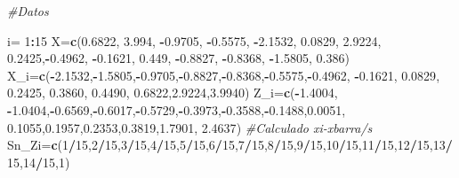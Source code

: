 \documentclass[a4paper,oneside,openany]{book}
\newenvironment{Shaded}{\begin{snugshade}}{\end{snugshade}}
\newcommand{\KeywordTok}[1]{\textcolor[rgb]{0.13,0.29,0.53}{\textbf{#1}}}
\newcommand{\DecValTok}[1]{\textcolor[rgb]{0.00,0.00,0.81}{#1}}
\newcommand{\FloatTok}[1]{\textcolor[rgb]{0.00,0.00,0.81}{#1}}
\newcommand{\StringTok}[1]{\textcolor[rgb]{0.31,0.60,0.02}{#1}}
\newcommand{\CommentTok}[1]{\textcolor[rgb]{0.56,0.35,0.01}{\textit{#1}}}
\newcommand{\OperatorTok}[1]{\textcolor[rgb]{0.81,0.36,0.00}{\textbf{#1}}}
\newcommand{\NormalTok}[1]{#1}
\begin{document}
\begin{Shaded}
\begin{Highlighting}[]
\CommentTok{#Datos}

\NormalTok{i=}\StringTok{ }\DecValTok{1}\OperatorTok{:}\DecValTok{15}
\NormalTok{X=}\KeywordTok{c}\NormalTok{(}\FloatTok{0.6822}\NormalTok{, }\FloatTok{3.994}\NormalTok{, }\OperatorTok{-}\FloatTok{0.9705}\NormalTok{, }\OperatorTok{-}\FloatTok{0.5575}\NormalTok{, }\OperatorTok{-}\FloatTok{2.1532}\NormalTok{, }\FloatTok{0.0829}\NormalTok{, }\FloatTok{2.9224}\NormalTok{,}
    \FloatTok{0.2425}\NormalTok{,}\OperatorTok{-}\FloatTok{0.4962}\NormalTok{, }\OperatorTok{-}\FloatTok{0.1621}\NormalTok{, }\FloatTok{0.449}\NormalTok{, }\OperatorTok{-}\FloatTok{0.8827}\NormalTok{, }\OperatorTok{-}\FloatTok{0.8368}\NormalTok{, }\OperatorTok{-}\FloatTok{1.5805}\NormalTok{, }\FloatTok{0.386}\NormalTok{)}
\NormalTok{X_i=}\KeywordTok{c}\NormalTok{(}\OperatorTok{-}\FloatTok{2.1532}\NormalTok{,}\OperatorTok{-}\FloatTok{1.5805}\NormalTok{,}\OperatorTok{-}\FloatTok{0.9705}\NormalTok{,}\OperatorTok{-}\FloatTok{0.8827}\NormalTok{,}\OperatorTok{-}\FloatTok{0.8368}\NormalTok{,}\OperatorTok{-}\FloatTok{0.5575}\NormalTok{,}\OperatorTok{-}\FloatTok{0.4962}\NormalTok{, }\OperatorTok{-}\FloatTok{0.1621}\NormalTok{,  }\FloatTok{0.0829}\NormalTok{,  }\FloatTok{0.2425}\NormalTok{,}
      \FloatTok{0.3860}\NormalTok{, }\FloatTok{0.4490}\NormalTok{,  }\FloatTok{0.6822}\NormalTok{,}\FloatTok{2.9224}\NormalTok{,}\FloatTok{3.9940}\NormalTok{)}
\NormalTok{Z_i=}\KeywordTok{c}\NormalTok{(}\OperatorTok{-}\FloatTok{1.4004}\NormalTok{, }\OperatorTok{-}\FloatTok{1.0404}\NormalTok{,}\OperatorTok{-}\FloatTok{0.6569}\NormalTok{,}\OperatorTok{-}\FloatTok{0.6017}\NormalTok{,}\OperatorTok{-}\FloatTok{0.5729}\NormalTok{,}\OperatorTok{-}\FloatTok{0.3973}\NormalTok{,}\OperatorTok{-}\FloatTok{0.3588}\NormalTok{,}\OperatorTok{-}\FloatTok{0.1488}\NormalTok{,}\FloatTok{0.0051}\NormalTok{,}
\FloatTok{0.1055}\NormalTok{,}\FloatTok{0.1957}\NormalTok{,}\FloatTok{0.2353}\NormalTok{,}\FloatTok{0.3819}\NormalTok{,}\FloatTok{1.7901}\NormalTok{,  }\FloatTok{2.4637}\NormalTok{) }\CommentTok{#Calculado xi-xbarra/s}
\NormalTok{Sn_Zi=}\KeywordTok{c}\NormalTok{(}\DecValTok{1}\OperatorTok{/}\DecValTok{15}\NormalTok{,}\DecValTok{2}\OperatorTok{/}\DecValTok{15}\NormalTok{,}\DecValTok{3}\OperatorTok{/}\DecValTok{15}\NormalTok{,}\DecValTok{4}\OperatorTok{/}\DecValTok{15}\NormalTok{,}\DecValTok{5}\OperatorTok{/}\DecValTok{15}\NormalTok{,}\DecValTok{6}\OperatorTok{/}\DecValTok{15}\NormalTok{,}\DecValTok{7}\OperatorTok{/}\DecValTok{15}\NormalTok{,}\DecValTok{8}\OperatorTok{/}\DecValTok{15}\NormalTok{,}\DecValTok{9}\OperatorTok{/}\DecValTok{15}\NormalTok{,}\DecValTok{10}\OperatorTok{/}\DecValTok{15}\NormalTok{,}\DecValTok{11}\OperatorTok{/}\DecValTok{15}\NormalTok{,}\DecValTok{12}\OperatorTok{/}\DecValTok{15}\NormalTok{,}\DecValTok{13}\OperatorTok{/}\DecValTok{15}\NormalTok{,}\DecValTok{14}\OperatorTok{/}\DecValTok{15}\NormalTok{,}\DecValTok{1}\NormalTok{)}

\end{Highlighting}
\end{Shaded}
\end{document}
